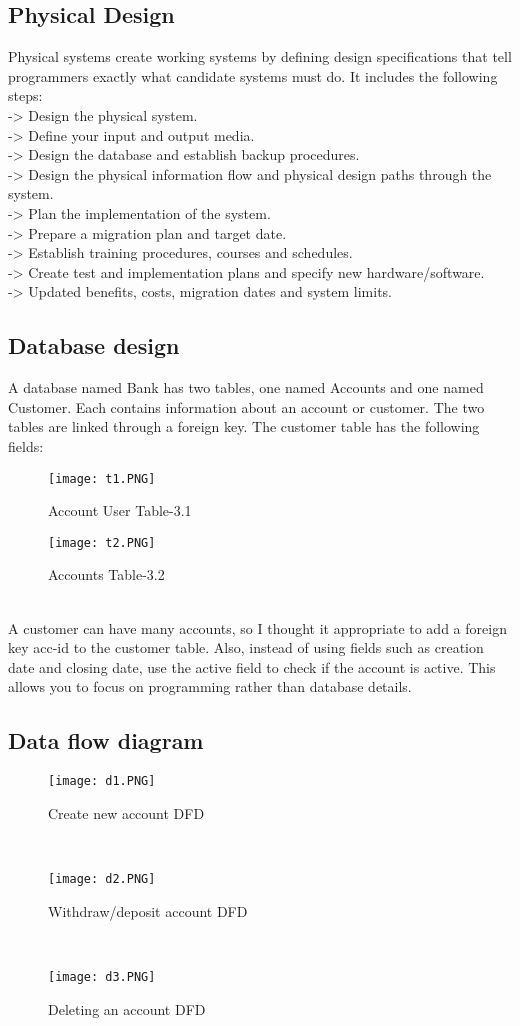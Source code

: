 \documentclass{article}
\begin{document}
\subsection{Physical Design}
Physical systems create working systems by defining design specifications that tell programmers exactly what candidate systems must do. It includes the following steps:\\ -> Design the physical system.\\ -> Define your input and output media.\\ -> Design the database and establish backup procedures. \\-> Design the physical information flow and physical design paths through the system.\\ -> Plan the implementation of the system.\\ -> Prepare a migration plan and target date.\\ -> Establish training procedures, courses and schedules.\\ -> Create test and implementation plans and specify new hardware/software. \\-> Updated benefits, costs, migration dates and system limits.
\subsection{Database design }
A database named Bank has two tables, one named Accounts and one named Customer. Each contains information about an account or customer. The two tables are linked through a foreign key. The customer table has the following fields:
\begin{figure}[htp]
    \centering
    \texttt{[image: t1.PNG]}
    \caption{Account User Table-3.1  }
\end{figure}
\begin{figure}[htp]
    \centering
    \texttt{[image: t2.PNG]}
    \caption{Accounts Table-3.2}
\end{figure}
\\
A customer can have many accounts, so I thought it appropriate to add a foreign key acc-id to the customer table. Also, instead of using fields such as creation date and closing date, use the active field to check if the account is active. This allows you to focus on programming rather than database details.
\subsection{Data flow diagram }
\begin{figure}[htp]
    \centering
    \texttt{[image: d1.PNG]}
    \caption{Create new account DFD}
\end{figure}
\\
\begin{figure}[htp]
    \centering
    \texttt{[image: d2.PNG]}
    \caption{Withdraw/deposit account DFD}
\end{figure}
\\
\begin{figure}[htp]
    \centering
    \texttt{[image: d3.PNG]}
    \caption{Deleting an account DFD}
\end{figure}
\end{document}
